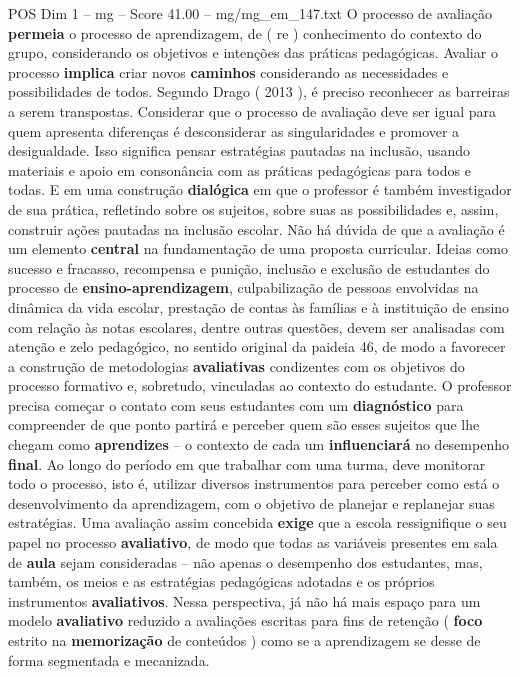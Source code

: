 \begin{textsample}{POS Dim 1 – mg – Score 41.00 – mg/mg\_em\_147.txt}
O processo de avaliação \textbf{permeia} o processo de aprendizagem, de ( re ) conhecimento do contexto do grupo, considerando os objetivos e intenções das práticas pedagógicas.
Avaliar o processo \textbf{implica} criar novos \textbf{caminhos} considerando as necessidades e possibilidades de todos.
Segundo Drago ( 2013 ), é preciso reconhecer as barreiras a serem transpostas.
Considerar que o processo de avaliação deve ser igual para quem apresenta diferenças é desconsiderar as singularidades e promover a desigualdade.
Isso significa pensar estratégias pautadas na inclusão, usando materiais e apoio em consonância com as práticas pedagógicas para todos e todas.
E em uma construção \textbf{dialógica} em que o professor é também investigador de sua prática, refletindo sobre os sujeitos, sobre suas as possibilidades e, assim, construir ações pautadas na inclusão escolar.
Não há dúvida de que a avaliação é um elemento \textbf{central} na fundamentação de uma proposta curricular.
Ideias como sucesso e fracasso, recompensa e punição, inclusão e exclusão de estudantes do processo de \textbf{ensino-aprendizagem}, culpabilização de pessoas envolvidas na dinâmica da vida escolar, prestação de contas às famílias e à instituição de ensino com relação às notas escolares, dentre outras questões, devem ser analisadas com atenção e zelo pedagógico, no sentido original da paideia 46, de modo a favorecer a construção de metodologias \textbf{avaliativas} condizentes com os objetivos do processo formativo e, sobretudo, vinculadas ao contexto do estudante.
O professor precisa começar o contato com seus estudantes com um \textbf{diagnóstico} para compreender de que ponto partirá e perceber quem são esses sujeitos que lhe chegam como \textbf{aprendizes} – o contexto de cada um \textbf{influenciará} no desempenho \textbf{final}.
Ao longo do período em que trabalhar com uma turma, deve monitorar todo o processo, isto é, utilizar diversos instrumentos para perceber como está o desenvolvimento da aprendizagem, com o objetivo de planejar e replanejar suas estratégias.
Uma avaliação assim concebida \textbf{exige} que a escola ressignifique o seu papel no processo \textbf{avaliativo}, de modo que todas as variáveis presentes em sala de \textbf{aula} sejam consideradas – não apenas o desempenho dos estudantes, mas, também, os meios e as estratégias pedagógicas adotadas e os próprios instrumentos \textbf{avaliativos}.
Nessa perspectiva, já não há mais espaço para um modelo \textbf{avaliativo} reduzido a avaliações escritas para fins de retenção ( \textbf{foco} estrito na \textbf{memorização} de conteúdos ) como se a aprendizagem se desse de forma segmentada e mecanizada.

\end{textsample}
